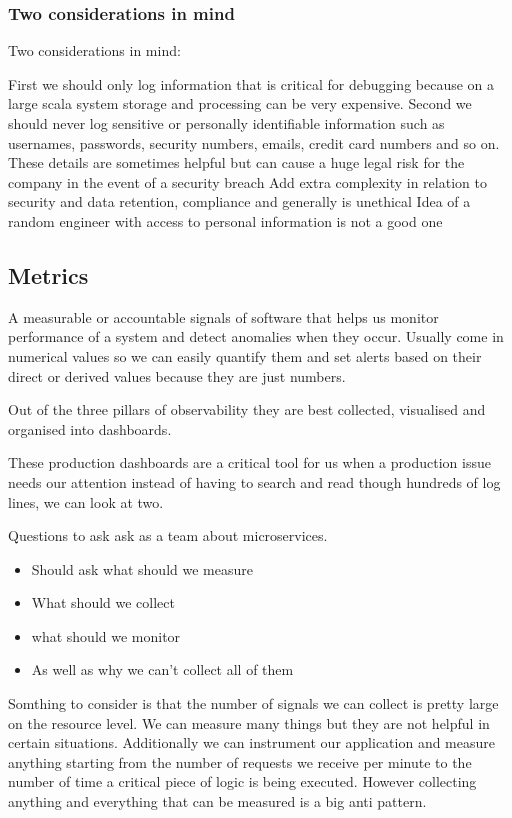 \documentclass[a4paper, 11pt]{book}
\begin{document}
    \subsubsection{Two considerations in mind}
    Two considerations in mind:

    First we should only log information that is critical for debugging because on a large scala system storage and processing can be very expensive.
    Second we should never log sensitive or personally identifiable information such as usernames, passwords, security numbers, emails, credit card numbers and so on.
    These details are sometimes helpful but can cause a huge legal risk for the company in the event of a security breach
    Add extra complexity in relation to security and data retention, compliance and generally is unethical
    Idea of a random engineer with access to personal information is not a good one

    \subsection{Metrics}
    A measurable or accountable signals of software that helps us monitor performance of a system and detect anomalies when they occur.
    Usually come in numerical values so we can easily quantify them and set alerts based on their direct or derived values because they are just numbers.

    Out of the three pillars of observability they are best collected, visualised and organised into dashboards.

    These production dashboards are a critical tool for us when a production issue needs our attention instead of having to search and read though hundreds of log lines, we can look at two.

    Questions to ask ask as a team about microservices.
    \begin{itemize}
        \item Should ask what should we measure
        \item What should we collect
        \item what should we monitor
        \item As well as why we can't collect all of them
    \end{itemize}

    Somthing to consider is that the number of signals we can collect is pretty large on the resource level.
    We can measure many things but they are not helpful in certain situations.
    Additionally we can instrument our application and measure anything starting from the number of requests we receive per minute to the number of time a critical piece of logic is being executed.
    However collecting anything and everything that can be measured is a big anti pattern.
\end{document}
